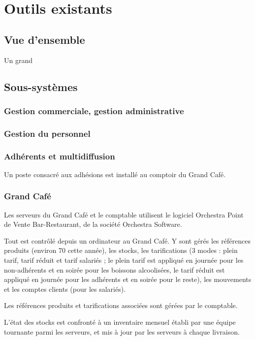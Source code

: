 \section{Outils existants}
\subsection{Vue d'ensemble}

Un grand 

\subsection{Sous-systèmes}

\subsubsection{Gestion commerciale, gestion administrative}

\subsubsection{Gestion du personnel}

\subsubsection{Adhérents et multidiffusion}

Un poste consacré aux adhésions est installé au comptoir du Grand Café.

\subsubsection{Grand Café}

Les serveurs du Grand Café et le comptable utilisent le logiciel Orchestra
Point de Vente Bar-Restaurant, de la société Orchestra Software.

Tout est contrôlé depuis un ordinateur au Grand Café. Y sont gérés les
références produits (environ 70 cette année), les stocks, les tarifications
(3 modes : plein tarif, tarif réduit et tarif salariés ; le plein tarif
est appliqué en journée pour les non-adhérents et en soirée pour les boissons
alcoolisées, le tarif réduit est appliqué en journée pour les adhérents
et en soirée pour le reste), les mouvements et les comptes clients (pour les
salariés).

Les références produits et tarifications associées sont gérées par le comptable.

L'état des stocks est confronté à un inventaire mensuel établi par une équipe
tournante parmi les serveurs, et mis à jour par les serveurs à chaque
livraison.

